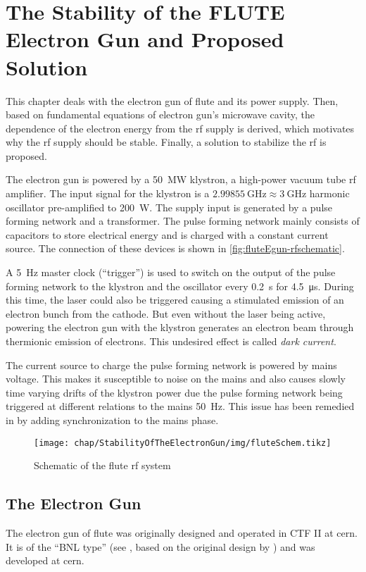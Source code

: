 \chapter{The Stability of the FLUTE Electron Gun and Proposed Solution}
This chapter deals with the electron gun of \gls{flute} and its power supply. Then, based on fundamental equations of electron gun's microwave cavity, the dependence of the electron energy from the \gls{rf} supply is derived, which motivates why the \gls{rf} supply should be stable. Finally, a solution to stabilize the \gls{rf} is proposed.

The electron gun is powered by a \SI{50}{\MW} klystron, a high-power vacuum tube \gls{rf} amplifier. The input signal for the klystron is a $\SI{2.99855}{\GHz}\approx\SI{3}{\GHz}$ harmonic oscillator pre-amplified to \SI{200}{\watt}. The supply input is generated by a pulse forming network and a transformer. The pulse forming network mainly consists of capacitors to store electrical energy and is charged with a constant current source. The connection of these devices is shown in \autoref{fig:fluteEgun-rfschematic}.

A \SI{5}{\hertz} master clock (``trigger'') is used to switch on the output of the pulse forming network to the klystron and the oscillator every \SI{0.2}{\second} for \SI{4.5}{\micro\second}. During this time, the laser could also be triggered causing a stimulated emission of an electron bunch from the cathode. But even without the laser being active, powering the electron gun with the klystron generates an electron beam through thermionic emission of electrons. This undesired effect is called \textit{dark current}.

The current source to charge the pulse forming network is powered by mains voltage. This makes it susceptible to noise on the mains and also causes slowly time varying drifts of the klystron power due the pulse forming network being triggered at different relations to the mains \SI{50}{\hertz}. This issue has been remedied in \cite{Nasse2019} by adding synchronization to the mains phase.

\begin{figure}[tbh]
	\centering
	\texttt{[image: chap/StabilityOfTheElectronGun/img/fluteSchem.tikz]}
	\caption[FLUTE RF schematic]{Schematic of the \gls{flute} \gls{rf} system}
	\label{fig:fluteEgun-rfschematic}
\end{figure}

\section{The Electron Gun}
The electron gun of \gls{flute} was originally designed and operated in CTF II at \gls{cern}. \cite{Schuh2014}
It is of the ``BNL type'' (see \cite{Batchelor1988}, based on the original design by \cite{fraser1987}) and was  developed at \gls{cern}. \cite{Bossart:288412}

